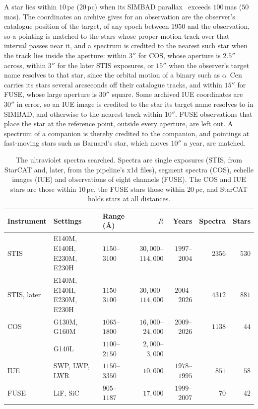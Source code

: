 \documentclass[3p,11pt]{elsarticle}
\begin{document}
A star lies within $10$\,pc ($20$\,pc) when its SIMBAD parallax~\cite{Wenger2000}
exceeds $100$\,mas ($50$\,mas). The coordinates an archive gives for an observation are
the observer's catalogue position of the target, of any epoch between $1950$ and the
observation, so a pointing is matched to the stars whose proper-motion track over that
interval passes near it, and a spectrum is credited to the nearest such star when the
track lies inside the aperture: within $3''$ for COS, whose aperture is $2.5''$ across,
within $3''$ for the later STIS exposures, or $15''$ when the observer's target name
resolves to that star, since the orbital motion of a binary such as $\alpha$~Cen carries
its stars several arcseconds off their catalogue tracks, and within $15''$ for FUSE,
whose large aperture is $30''$ square. Some archived IUE
coordinates are $30''$ in error, so an IUE image is credited to the star its target name
resolves to in SIMBAD, and otherwise to the nearest track within $10''$. FUSE
observations that place the star at the reference point, outside every aperture, are
left out. A spectrum of a companion is thereby credited to the companion, and pointings
at fast-moving stars such as Barnard's star, which moves $10''$ a year, are matched.

\begin{table}[t]
\centering\small
\setlength{\tabcolsep}{4.5pt}
\caption{The ultraviolet spectra searched. Spectra are single exposures (STIS, from
StarCAT and, later, from the pipeline's x1d files), segment spectra (COS), echelle images
(IUE) and observations of eight channels (FUSE).
The COS and IUE stars are those within $10$\,pc, the FUSE stars those within $20$\,pc,
and StarCAT holds stars at all distances.}
\label{tab:data}
\begin{tabular}{@{}lllrrrr@{}}
\toprule
Instrument & Settings & Range (\AA) & $R$ & Years & Spectra & Stars\\
\midrule
STIS & E140M, E140H, E230M, E230H & $1150$--$3100$ & $30{,}000$--$114{,}000$ & $1997$--$2004$ & $2356$ & $530$\\
STIS, later & E140M, E140H, E230M, E230H & $1150$--$3100$ & $30{,}000$--$114{,}000$ & $2004$--$2026$ & $4312$ & $881$\\
COS & G130M, G160M & $1065$--$1800$ & $16{,}000$--$24{,}000$ & $2009$--$2026$ & $1138$ & $44$\\
 & G140L & $1100$--$2150$ & $2{,}000$--$3{,}000$ & & & \\
IUE & SWP, LWP, LWR & $1150$--$3350$ & $10{,}000$ & $1978$--$1995$ & $851$ & $58$\\
FUSE & LiF, SiC & $905$--$1187$ & $17{,}000$ & $1999$--$2007$ & $70$ & $42$\\
\bottomrule
\end{tabular}
\end{table}
\end{document}
